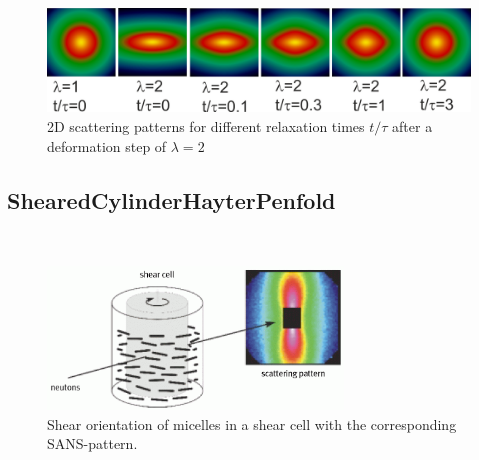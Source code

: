 \begin{figure}[htb]
\begin{center}
\includegraphics[width=\textwidth]{../images/form_factor/reptating_chain/lambda_2_reptating_chains.png}
\end{center}
\caption{2D scattering patterns for different relaxation times $t/\tau$ after a deformation step of $\lambda=2$}
\label{fig:IQ2Dstretchedpolymermelt}
\end{figure}


\subsection{ShearedCylinderHayterPenfold \cite{Hayter1984}}
\label{sect:ShearedCylinderHayterPenfold}
\hspace{1pt}\\

\begin{figure}[htb]
\begin{center}
\includegraphics[width=0.7\textwidth,height=0.3\textwidth]{sheared_cylinders1.png}
\end{center}
\caption{Shear orientation of micelles in a shear cell with the
corresponding SANS-pattern.} \label{sheared_cylinders1}
\end{figure}

